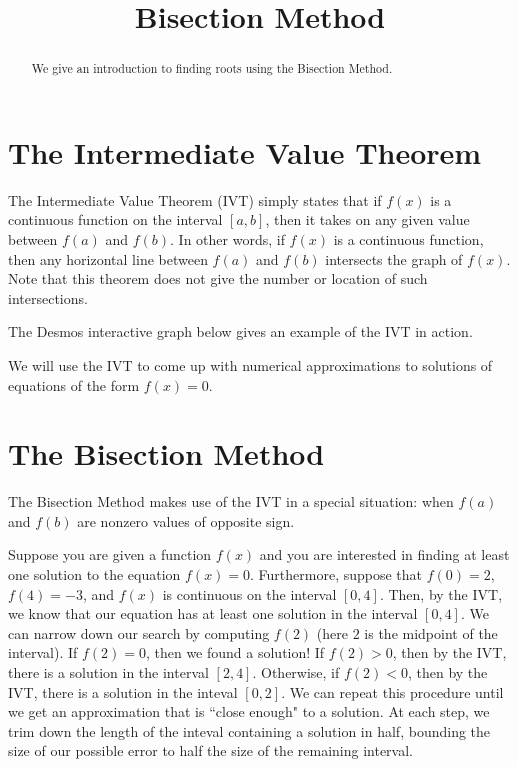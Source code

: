 \documentclass{ximera}
\title{Bisection Method}
\begin{document}
  
\begin{abstract}  
We give an introduction to finding roots using the Bisection Method.
\end{abstract}  
\maketitle

\section{The Intermediate Value Theorem}

The Intermediate Value Theorem (IVT) simply states that if $f(x)$ is a continuous function on the interval $[a,b]$, then it takes on any given value between $f(a)$ and $f(b)$. In other words, if $f(x)$ is a continuous function, then any horizontal line between $f(a)$ and $f(b)$ intersects the graph of $f(x)$. Note that this theorem does not give the number or location of such intersections. 

The Desmos interactive graph below gives an example of the IVT in action.


We will use the IVT to come up with numerical approximations to solutions of equations of the form $f(x)=0$. 

\section{The Bisection Method}

The Bisection Method makes use of the IVT in a special situation: when $f(a)$ and $f(b)$ are nonzero values of opposite sign.

Suppose you are given a function $f(x)$ and you are interested in finding at least one solution to the equation $f(x)=0$. Furthermore, suppose that $f(0)=2$, $f(4)=-3$, and $f(x)$ is continuous on the interval $[0,4]$. Then, by the IVT, we know that our equation has at least one solution in the interval $[0,4]$. We can narrow down our search by computing $f(2)$ (here $2$ is the midpoint of the interval). If $f(2)=0$, then we found a solution! If $f(2)>0$, then by the IVT, there is a solution in the interval $[2,4]$. Otherwise, if $f(2)<0$, then by the IVT, there is a solution in the inteval $[0,2]$. We can repeat this procedure until we get an approximation that is ``close enough" to a solution. At each step, we trim down the length of the inteval containing a solution in half, bounding the size of our possible error to half the size of the remaining interval. 
\end{document}

